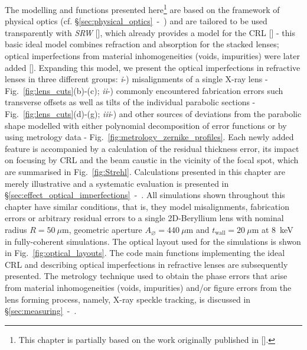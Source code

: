 \begin{refsection}
The modelling and functions presented here\footnote{This chapter is partially based on the work originally published in [\cite{Celestre2020b}].} are based on the framework of physical optics (cf. \S\ref{sec:physical_optics}~-~\textit{}) and are tailored to be used transparently with \textit{SRW} [\cite{Chubar1998}], which already provides a model for the CRL [\cite{Baltser2011}] - this basic ideal model combines refraction and absorption for the stacked lenses; optical imperfections from material inhomogeneities (voids, impurities) were later added [\cite{Roth2014}]. Expanding this model, we present the optical imperfections in refractive lenses in three different groups: \textit{i}-) misalignments of a single X-ray lens - Fig.~\ref{fig:lens_cuts}(b)-(c); \textit{ii}-) commonly encountered fabrication errors such transverse offsets as well as tilts of the individual parabolic sections - Fig.~\ref{fig:lens_cuts}(d)-(g); \textit{iii}-) and other sources of deviations from the parabolic shape modelled with either polynomial decomposition of error functions or by using metrology data - Fig.~\ref{fig:metrology_zernike_profiles}. Each newly added feature is accompanied by a calculation of the residual thickness error, its impact on focusing by CRL and the beam caustic in the vicinity of the focal spot, which are summarised in Fig.~\ref{fig:Strehl}. Calculations presented in this chapter are merely illustrative and a systematic evaluation is presented in \S\ref{sec:effect_optical_imperfections}~-~\textit{}. All simulations shown throughout this chapter have similar conditions, that is, they model misalignments, fabrication errors or arbitrary residual errors to a single 2D-Beryllium lens with nominal radius $R=50~\mu\text{m}$, geometric aperture $A_{\diameter}=440~\mu\text{m}$ and $t_\text{wall}=20~\mu$m at 8~keV in fully-coherent simulations. The optical layout used for the simulations is shwon in Fig.~\ref{fig:optical_layouts}. The code main functions implementing the ideal CRL and describing optical imperfections in refractive lenses are subsequently presented. The metrology technique used to obtain the phase errors that arise from material inhomogeneities (voids, impurities) and/or figure errors from the lens forming process, namely, X-ray speckle tracking, is discussed in \S\ref{sec:measuring}~-~\textit{}.


\end{refsection}
